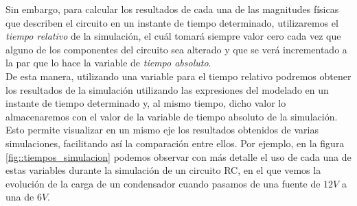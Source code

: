 \documentclass[../main.tex]{subfiles}
\begin{document}
Sin embargo, para calcular los resultados de cada una de las magnitudes físicas que describen el circuito en un instante de tiempo determinado, utilizaremos el \textit{tiempo relativo} de la simulación, el cuál tomará siempre valor cero cada vez que alguno de los componentes del circuito sea alterado y que se verá incrementado a la par que lo hace la variable de \textit{tiempo absoluto}.\\

De esta manera, utilizando una variable para el tiempo relativo podremos obtener los resultados de la simulación utilizando las expresiones del modelado en un instante de tiempo determinado y, al mismo tiempo, dicho valor lo almacenaremos con el valor de la variable de tiempo absoluto de la simulación. Esto permite visualizar en un mismo eje los resultados obtenidos de varias simulaciones, facilitando así la comparación entre ellos. Por ejemplo, en la figura \ref{fig::tiempos_simulacion} podemos observar con más detalle el uso de cada una de estas variables durante la simulación de un circuito RC, en el que vemos la evolución de la carga de un condensador cuando pasamos de una fuente de $12V$ a una de $6V$.\\
\end{document}
